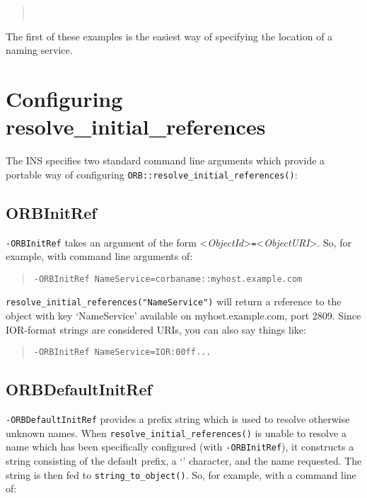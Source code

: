 \documentclass[11pt,oneside,a4paper]{book}
\newcommand{\code}[1]{\texttt{#1}}
\newcommand{\op}[1]{\texttt{#1()}}
\newcommand{\cmdline}[1]{\texttt{#1}}
\begin{document}
\begin{quote}
\\
\end{quote}

\noindent The first of these examples is the easiest way of specifying
the location of a naming service.


\section{Configuring resolve\_initial\_references}
\label{sec:insargs}

The INS specifies two standard command line arguments which provide a
portable way of configuring \op{ORB::resolve\_initial\_references}:


\subsection{ORBInitRef}

\cmdline{-ORBInitRef} takes an argument of the form
<\textit{ObjectId}>\cmdline{=}<\textit{ObjectURI}>. So, for example,
with command line arguments of:

\begin{quote}
\cmdline{-ORBInitRef NameService=corbaname::myhost.example.com}
\end{quote}

\noindent \code{resolve\_initial\_references("NameService")} will
return a reference to the object with key `NameService' available on
myhost.example.com, port 2809. Since IOR-format strings are considered
URIs, you can also say things like:

\begin{quote}
\cmdline{-ORBInitRef NameService=IOR:00ff...}
\end{quote}


\subsection{ORBDefaultInitRef}

\cmdline{-ORBDefaultInitRef} provides a prefix string which is used to
resolve otherwise unknown names. When
\op{resolve\_initial\_references} is unable to resolve a name which
has been specifically configured (with \cmdline{-ORBInitRef}), it
constructs a string consisting of the default prefix, a `\corbauri{/}'
character, and the name requested.  The string is then fed to
\op{string\_to\_object}. So, for example, with a command line of:
\end{document}
